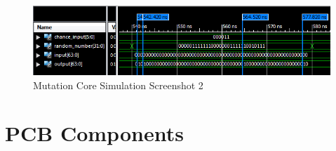 \begin{figure}[H]
\includegraphics[width=\textwidth]{fpga/fig/testbenches/mutation_simulation2.png}
\caption{Mutation Core Simulation Screenshot 2}
\label{fig_mutation_testbench2}
\end{figure}


\chapter{PCB Components} \label{appendix:components}

\newpage
